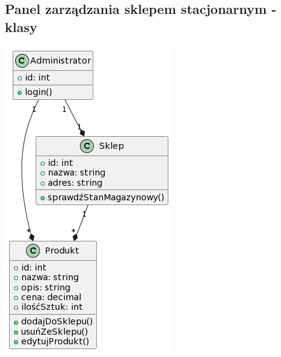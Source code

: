\subsection{Panel zarządzania sklepem stacjonarnym - klasy}\label{subsec:panel-zarzadzania-sklepem-stacjonarnym-classes}

\includegraphics{../diagrams/class/sklep_klasy}
